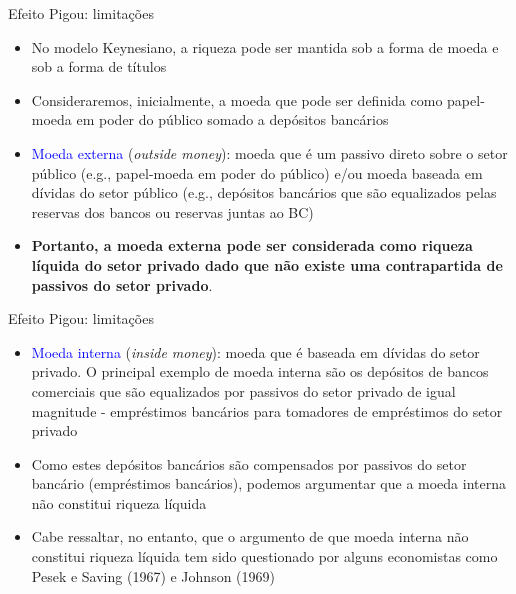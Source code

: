 \documentclass[10pt]{beamer}
\begin{document}
\begin{frame}{Efeito Pigou: limitações}
    \begin{itemize}
        \item No modelo Keynesiano, a riqueza pode ser mantida sob a forma de moeda e sob a forma de títulos
        \bigskip
        \item Consideraremos, inicialmente, a moeda que pode ser definida como papel-moeda em poder do público somado a depósitos bancários
        \bigskip
        \item \textcolor{blue}{Moeda externa} (\emph{outside money}): moeda que é um passivo direto sobre o setor público (e.g., papel-moeda em poder do público) e/ou moeda baseada em dívidas do setor público (e.g., depósitos bancários que são equalizados pelas reservas dos bancos ou reservas juntas ao BC)
        \bigskip
        \item \textbf{Portanto, a moeda externa pode ser considerada como riqueza líquida do setor privado dado que não existe uma contrapartida de passivos do setor privado}.
    \end{itemize}
\end{frame}

\begin{frame}{Efeito Pigou: limitações}
    \begin{itemize}
        \item \textcolor{blue}{Moeda interna} (\emph{inside money}): moeda que é baseada em dívidas do setor privado. O principal exemplo de moeda interna são os depósitos de bancos comerciais que são equalizados por passivos do setor privado de igual magnitude - empréstimos bancários para tomadores de empréstimos do setor privado
        \bigskip
        \item Como estes depósitos bancários são compensados por passivos do setor bancário (empréstimos bancários), podemos argumentar que a moeda interna não constitui riqueza líquida
        \bigskip
        \item Cabe ressaltar, no entanto, que o argumento de que moeda interna não constitui riqueza líquida tem sido questionado por alguns economistas como Pesek e Saving (1967) e Johnson (1969)
    \end{itemize}
\end{frame}
\end{document}
